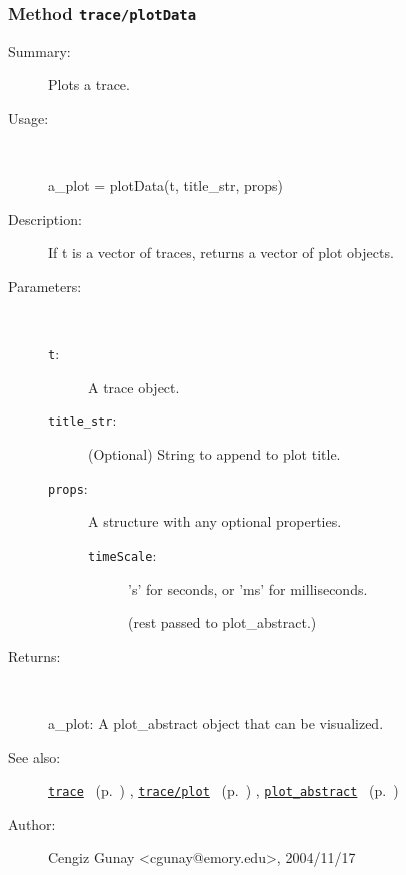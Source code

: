 \subsubsection[Method \texttt{plotData}]{Method \texttt{trace/plotData}}%
%
\label{ref_trace__plotData}%
\hypertarget{ref_trace__plotData}{}%
\begin{description}
\item[Summary:]Plots a trace.
%
\item[Usage:]~%
\begin{lyxcode}%
a\_plot = plotData(t, title\_str, props)
%
\end{lyxcode}%
%
\item[Description:]%
If t is a vector of traces, returns a vector of plot objects.
\item[Parameters:]~
\begin{description}%
\item[\texttt{t}:]
 A trace object.
\item[\texttt{title\_str}:]
 (Optional) String to append to plot title.
\item[\texttt{props}:]
 A structure with any optional properties.
\begin{description}%
\item[\texttt{timeScale}:]
 's' for seconds, or 'ms' for milliseconds.

(rest passed to plot\_abstract.)\end{description}%
\end{description}%
%
\item[Returns:]~

	a\_plot: A plot\_abstract object that can be visualized.
%
%
\item[See also:]%
\hyperlink{ref_trace}{\texttt{trace}}%
\ (p.~\pageref{ref_trace})%
%
, \hyperlink{ref_trace__plot}{\texttt{trace/plot}}%
\ (p.~\pageref{ref_trace__plot})%
%
, \hyperlink{ref_plot_abstract}{\texttt{plot\_abstract}}%
\ (p.~\pageref{ref_plot_abstract})%
%
%
\item[Author:]%
Cengiz Gunay <cgunay@emory.edu>, 2004/11/17%
\end{description}
\methodline%
